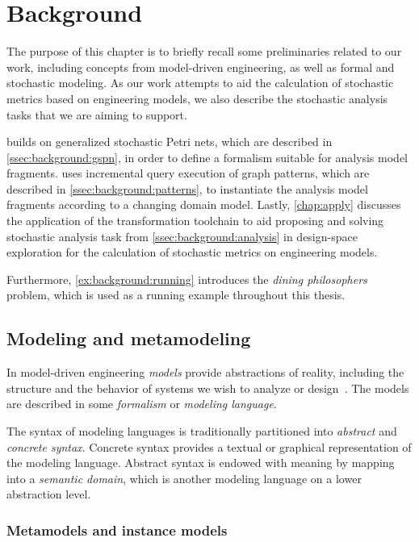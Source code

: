\chapter{Background}
\label{chap:background}

The purpose of this chapter is to briefly recall some preliminaries related to our work, including concepts from model-driven engineering, as well as formal and stochastic modeling. As our work attempts to aid the calculation of stochastic metrics based on engineering models, we also describe the stochastic analysis tasks that we are aiming to support.

 builds on generalized stochastic Petri nets, which are described in \vref{ssec:background:gspn}, in order to define a formalism suitable for analysis model fragments.  uses incremental query execution of graph patterns, which are described in \vref{ssec:background:patterns}, to instantiate the analysis model fragments according to a changing domain model. Lastly, \cref{chap:apply} discusses the application of the transformation toolchain to aid proposing and solving stochastic analysis task from \vref{ssec:background:analysis} in design-space exploration for the calculation of stochastic metrics on engineering models.

Furthermore, \vref{ex:background:running} introduces the \emph{dining philosophers} problem, which is used as a running example throughout this thesis.

\section{Modeling and metamodeling}

In model-driven engineering \emph{models} provide abstractions of reality, including the structure and the behavior of systems we wish to analyze or design~\citep{Giese06multiparadigm}. The models are described in some \emph{formalism} or \emph{modeling language}.

The syntax of modeling languages is traditionally partitioned into \emph{abstract} and \emph{concrete syntax}. Concrete syntax provides a textual or graphical representation of the modeling language. Abstract syntax is endowed with meaning by mapping into a \emph{semantic domain}, which is another modeling language on a lower abstraction level.

\subsection{Metamodels and instance models}

